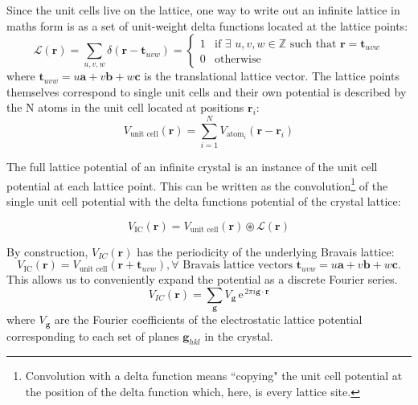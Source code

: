 Since the unit cells live on the lattice, one way to write out an infinite lattice in maths form is as a set of unit-weight delta functions located at the lattice points:
\begin{equation}
\mathcal{L}(\mathbf{r}) = \sum_{u,v,w} \delta(\mathbf{r}-\mathbf{t}_{uvw})= \begin{cases} 1 & \mbox{if }	\exists \, \, u, v, w \in  \mathbb{Z} \mbox{ such that  }  \mathbf{r}=\mathbf{t}_{uvw} \\
																						  0 & \mbox{otherwise }
																							\end{cases}
\end{equation}
where $\mathbf{t}_{uvw} =  u\mathbf{a} + v\mathbf{b} + w\mathbf{c}$ is the translational lattice vector. The lattice points themselves correspond to single unit cells and their own potential is described by the N atoms in the unit cell located at positions $\mathbf{r}_i$:
\begin{equation}
V_{\text{unit cell}}(\mathbf{r}) = \sum_{i=1}^{N} V_{\text{atom}_i}(\mathbf{r}- \mathbf{r}_i)
\end{equation}

The full lattice potential of an infinite crystal is an instance of the unit cell potential at each lattice point. This can be written as the convolution\footnote{ Convolution with a delta function means ``copying" the unit cell potential at the position of the delta function which, here, is every lattice site.} of the single unit cell potential with the delta functions potential of the crystal lattice:

\begin{equation}
V_{\text{IC}}(\mathbf{r} ) = V_{\text{unit cell}}(\mathbf{r})  \circledast  \mathcal{L}(\mathbf{r})
\end{equation}

By construction, $V_{IC}(\mathbf{r})$ has the periodicity of the underlying Bravais lattice:
\begin{equation}
V_{\text{IC}}(\mathbf{r} ) = V_{\text{unit cell}}(\mathbf{r} + \mathbf{t}_{uvw} ),  \forall \text{ Bravais lattice vectors } \mathbf{t}_{uvw} = u\mathbf{a} + v\mathbf{b} + w\mathbf{c}.
\end{equation}
This allows us to conveniently expand the potential as a discrete Fourier series.
\begin{equation}
V_{IC}(\mathbf{r} ) = \sum_{\mathbf{g}} V_{\mathbf{g}} \, \mathrm{e}^{\, 2\pi i \mathbf{g}\cdot \mathbf{r}}
\end{equation}
where $V_{\mathbf{g}}$ are the Fourier coefficients of the electrostatic lattice potential corresponding to each set of planes $\mathbf{g}_{hkl}$ in the crystal. 

